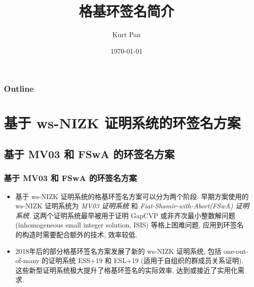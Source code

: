 \documentclass{beamer}
\title{格基环签名简介}
\author{Kurt Pan}
\institute[]{Fudan University}
\date{\today}
\begin{document}
    \begin{frame}
        
        \titlepage
    
    \end{frame}


    \begin{frame}
        \frametitle{Outline}
        \tableofcontents
    \end{frame}



    \section{基于 ws-NIZK 证明系统的环签名方案}
    \begin{frame}
        \frametitle{}
        \sectionpage
        
    
    \end{frame}
    
    \subsection{基于 MV03 和 FSwA 的环签名方案}
    \begin{frame}
        \frametitle{基于 MV03 和 FSwA 的环签名方案}
        \begin{itemize}
            \item 基于 ws-NIZK 证明系统的格基环签名方案可以分为两个阶段. 早期方案使用的 ws-NIZK 证明系统为 \emph{MV03 证明系统}  和 \emph{Fiat-Shamir-with-Abort(FSwA) 证明系统}. 这两个证明系统最早被用于证明 GapCVP 或非齐次最小整数解问题 (inhomogeneous small integer solution, ISIS) 等格上困难问题, 应用到环签名的构造时需要配合额外的技术, 效率较低.
            \item 2018年后的部分格基环签名方案发展了新的 ws-NIZK 证明系统, 包括 one-out-of-many 的证明系统 ESS+19 和 ESL+19 (适用于自组织的群成员关系证明). 这些新型证明系统极大提升了格基环签名的实际效率, 达到或接近了实用化需求.
 
        \end{itemize}
    \end{frame}
\end{document}

